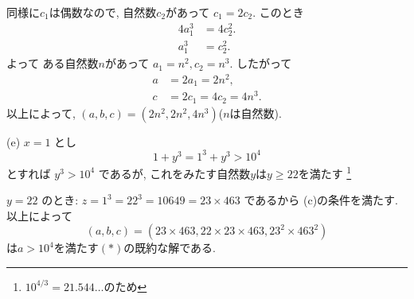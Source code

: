 \documentclass{jarticle}
\begin{document}
同様に$c_1$は偶数なので, 自然数$c_2$があって $c_1 = 2c_2$.
このとき
\begin{align*}
4a_1^3 &= 4c_2^2. \\
a_1^3 &= c_2^2.
\end{align*}
よって ある自然数$n$があって $a_1 = n^2, c_2 = n^3$.
したがって
\begin{align*}
a &= 2a_1 = 2n^2, \\
c &= 2c_1 = 4c_2 = 4n^3.
\end{align*}
以上によって, $(a, b, c) = (2n^2, 2n^2, 4n^3)$($n$は自然数).

\noindent (e)
$x = 1$ とし
\[
  1 + y^3 = 1^3 + y^3 > 10^4
\]
とすれば $y^3 > 10^4$ であるが, これをみたす自然数$y$は$y \ge 22$を満たす \footnote{
  $10^{4/3} = 21.544\ldots$のため}

$y=22$ のとき: $z = 1^3 = 22^3 = 10649 = 23 \times 463$ であるから (c)の条件を満たす.
  以上によって
  \[
  (a, b, c) = (23 \times 463, 22 \times 23 \times 463, 23^2 \times 463^2)
  \]
  は$a > 10^4$を満たす$(\ast)$の既約な解である.
\end{document}

